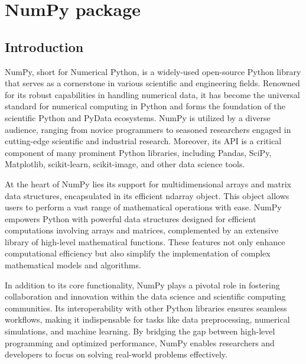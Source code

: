 
%
%

\chapter{NumPy package}

\section{Introduction}

NumPy, short for Numerical Python, is a widely-used open-source Python library that serves as a cornerstone in various scientific and engineering fields. Renowned for its robust capabilities in handling numerical data, it has become the universal standard for numerical computing in Python and forms the foundation of the scientific Python and PyData ecosystems. NumPy is utilized by a diverse audience, ranging from novice programmers to seasoned researchers engaged in cutting-edge scientific and industrial research. Moreover, its API is a critical component of many prominent Python libraries, including Pandas, SciPy, Matplotlib, scikit-learn, scikit-image, and other data science tools.\cite{NumPy:2024}

At the heart of NumPy lies its support for multidimensional arrays and matrix data structures, encapsulated in its efficient ndarray object. This object allows users to perform a vast range of mathematical operations with ease. NumPy empowers Python with powerful data structures designed for efficient computations involving arrays and matrices, complemented by an extensive library of high-level mathematical functions. These features not only enhance computational efficiency but also simplify the implementation of complex mathematical models and algorithms.

In addition to its core functionality, NumPy plays a pivotal role in fostering collaboration and innovation within the data science and scientific computing communities. Its interoperability with other Python libraries ensures seamless workflows, making it indispensable for tasks like data preprocessing, numerical simulations, and machine learning. By bridging the gap between high-level programming and optimized performance, NumPy enables researchers and developers to focus on solving real-world problems effectively. \cite{NumPy:2024}

